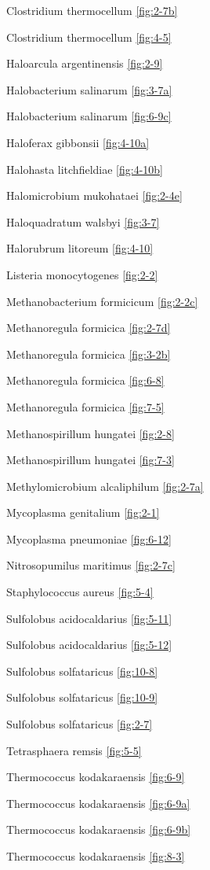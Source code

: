 \documentclass[]{tufte-book}
\begin{document}
Clostridium thermocellum \ref{fig:2-7b}

Clostridium thermocellum \ref{fig:4-5}

Haloarcula argentinensis \ref{fig:2-9}

Halobacterium salinarum \ref{fig:3-7a}

Halobacterium salinarum \ref{fig:6-9c}

Haloferax gibbonsii \ref{fig:4-10a}

Halohasta litchfieldiae \ref{fig:4-10b}

Halomicrobium mukohataei \ref{fig:2-4e}

Haloquadratum walsbyi \ref{fig:3-7}

Halorubrum litoreum \ref{fig:4-10}

Listeria monocytogenes \ref{fig:2-2}

Methanobacterium formicicum \ref{fig:2-2c}

Methanoregula formicica \ref{fig:2-7d}

Methanoregula formicica \ref{fig:3-2b}

Methanoregula formicica \ref{fig:6-8}

Methanoregula formicica \ref{fig:7-5}

Methanospirillum hungatei \ref{fig:2-8}

Methanospirillum hungatei \ref{fig:7-3}

Methylomicrobium alcaliphilum \ref{fig:2-7a}

Mycoplasma genitalium \ref{fig:2-1}

Mycoplasma pneumoniae \ref{fig:6-12}

Nitrosopumilus maritimus \ref{fig:2-7c}

Staphylococcus aureus \ref{fig:5-4}

Sulfolobus acidocaldarius \ref{fig:5-11}

Sulfolobus acidocaldarius \ref{fig:5-12}

Sulfolobus solfataricus \ref{fig:10-8}

Sulfolobus solfataricus \ref{fig:10-9}

Sulfolobus solfataricus \ref{fig:2-7}

Tetrasphaera remsis \ref{fig:5-5}

Thermococcus kodakaraensis \ref{fig:6-9}

Thermococcus kodakaraensis \ref{fig:6-9a}

Thermococcus kodakaraensis \ref{fig:6-9b}

Thermococcus kodakaraensis \ref{fig:8-3}
\end{document}
